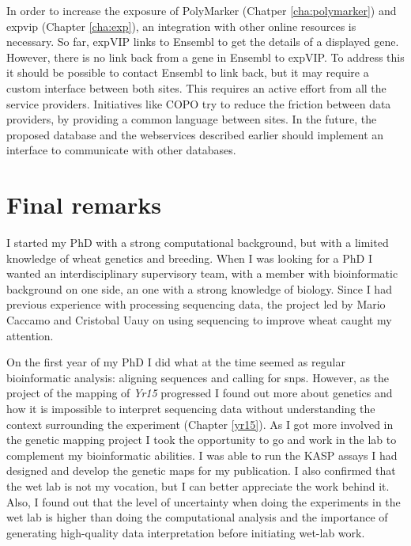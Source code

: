 In order to increase the exposure of PolyMarker (Chatper \ref{cha:polymarker}) and \gls{expvip} (Chapter \ref{cha:exp}), an integration with other online resources is necessary. 
So far, expVIP links to Ensembl to get the details of a displayed gene. 
However, there is no link back from a gene in Ensembl to expVIP. 
To address this it should be possible to contact Ensembl to link back, but it may require a custom interface between both sites. 
This requires an active effort from all the service providers. 
Initiatives like COPO try to reduce the friction between data providers, by providing a common language between sites. 
In the future, the proposed database and the webservices described earlier should implement an interface to communicate with other databases. 

\pagebreak
\section{Final remarks}

I started my PhD with a strong computational background, but with a limited knowledge of wheat genetics and breeding.
When I was looking for a PhD I wanted an interdisciplinary supervisory team, with a member with bioinformatic background on one side, an one with a strong knowledge of biology. 
Since I had previous experience with processing sequencing data, the project led by Mario Caccamo and Cristobal Uauy on using sequencing to improve wheat caught my attention.

On the first year of my PhD I did what at the time seemed as regular bioinformatic analysis: aligning sequences and calling for \glspl{snp}. 
However, as the project of the mapping of \textit{Yr15} progressed I found out more about genetics and how it is impossible to interpret sequencing data without understanding the context surrounding the experiment (Chapter \ref{yr15}). 
As I got more involved in the genetic mapping project I took the opportunity to go and work in the lab to complement my bioinformatic abilities. 
I was able to run the KASP assays I had designed and develop the genetic maps for my publication. 
I also confirmed that the wet lab is not my vocation, but I can better appreciate the work behind it. 
Also, I found out that the level of uncertainty when doing the experiments in the wet lab is higher than doing the computational analysis and the importance of generating high-quality data interpretation before initiating wet-lab work.

